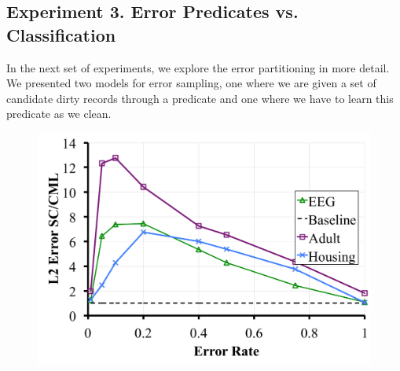 \subsection{Experiment 3. Error Predicates vs. Classification}
In the next set of experiments, we explore the error partitioning in more detail.
We presented two models for error sampling, one where we are given a set of candidate dirty records through a predicate and one where we have to learn this predicate as we clean.

\begin{figure}[ht!]
\centering
  \includegraphics[scale=0.15]{exp/exp5c.pdf}
 \caption{ \label{tradeoffs2}}
\end{figure}

